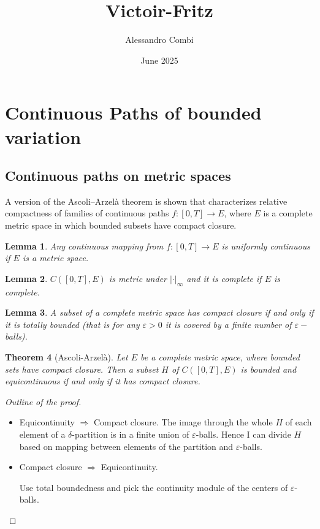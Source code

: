 \documentclass{article}
\title{Victoir-Fritz}
\author{Alessandro Combi}
\date{June 2025}
\newtheorem{theorem}{Theorem}
\newtheorem{lemma}[theorem]{Lemma}
\begin{document}
\maketitle

\section{Continuous Paths of bounded variation}

\subsection{Continuous paths on metric spaces}

A version of the Ascoli–Arzelà theorem is shown that characterizes relative compactness of families of continuous paths \( f:[0,T] \to E \), where \( E \) is a complete metric space in which bounded subsets have compact closure.

\begin{lemma}
Any continuous mapping from $f:[0,T] \rightarrow E$ is uniformly continuous if $E$ is a metric space.
\end{lemma}

\begin{lemma}
    $C([0,T],E)$ is metric under $|\cdot|_{\infty}$ and it is complete if $E$ is complete.
\end{lemma}

\begin{lemma}
    A subset of a complete metric space has compact closure if and only if it is totally bounded (that is for any $\varepsilon > 0$ it is covered by a finite number of $\varepsilon-$balls).
\end{lemma}

\begin{theorem}[Ascoli-Arzelà]
    Let $E$ be a complete metric space, where bounded sets have compact closure. Then a subset $H$ of $C([0,T],E)$ is bounded and equicontinuous if and only if it has compact closure.
\end{theorem}
\begin{proof}[Outline of the proof]
\begin{itemize}

\item Equicontinuity $\Rightarrow$ Compact closure.
The image through the whole $H$ of each element of a $\delta$-partition is in a finite union of $\varepsilon$-balls.
Hence I can divide $H$ based on mapping between elements of the partition and $\varepsilon$-balls.

\item Compact closure $\Rightarrow$ Equicontinuity.

Use total boundedness and pick the continuity module of the centers of $\varepsilon$-balls.
\end{itemize}
\end{proof}
\end{document}
